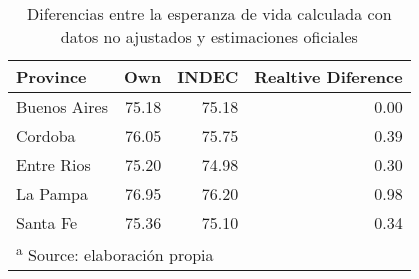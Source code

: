 \documentclass[12pt,]{article}
\begin{document}
\begin{table}

\caption{\label{tab:Dif_e0_INDEC}Diferencias entre la esperanza de vida calculada con datos no ajustados y estimaciones oficiales}
\centering
\begin{tabular}[t]{l|r|r|r}
\hline
Province & Own & INDEC & Realtive Diference\\
\hline
Buenos Aires & 75.18 & 75.18 & 0.00\\
\hline
Cordoba & 76.05 & 75.75 & 0.39\\
\hline
Entre Rios & 75.20 & 74.98 & 0.30\\
\hline
La Pampa & 76.95 & 76.20 & 0.98\\
\hline
Santa Fe & 75.36 & 75.10 & 0.34\\
\hline
\multicolumn{4}{l}{\textsuperscript{a} Source: elaboración propia}\\
\end{tabular}
\end{table}
\end{document}
